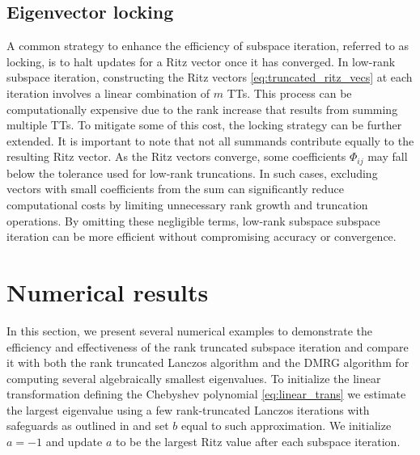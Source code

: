 \documentclass[10pt,preprint]{elsarticle}
\begin{document}
\subsection{Eigenvector locking} 
\label{sec:locking}
%
A common strategy to enhance the efficiency of subspace iteration, referred to as locking, is to halt updates for a Ritz vector once it has converged. In low-rank subspace iteration, constructing the Ritz vectors \eqref{eq:truncated_ritz_vecs} at each iteration involves a linear combination of $m$ TTs. This process can be computationally expensive due to the rank increase that results from summing multiple TTs. To mitigate some of this cost, the locking strategy can be further extended. 
%
It is important to note that not all summands contribute equally to the resulting Ritz vector. As the Ritz vectors converge, some coefficients $\Phi_{ij}$ may fall below the tolerance used for low-rank truncations. In such cases, excluding vectors with small coefficients from the sum can significantly reduce computational costs by limiting unnecessary rank growth and truncation operations. By omitting these negligible terms, low-rank subspace subspace iteration can be more efficient without compromising accuracy or convergence.



\section{Numerical results}
\label{sec:numerics} 
In this section, we present several numerical examples to demonstrate the efficiency and effectiveness of the rank truncated subspace iteration and compare it with both the rank truncated Lanczos algorithm and the DMRG algorithm for computing several algebraically smallest eigenvalues. To initialize the linear transformation defining the Chebyshev polynomial \eqref{eq:linear_trans} we estimate the largest eigenvalue using a few rank-truncated Lanczos iterations with safeguards as outlined in \cite{spec_bound} and set $b$ equal to such approximation. We initialize $a=-1$ and update $a$ to be the largest Ritz value after each subspace iteration. 
\end{document}
